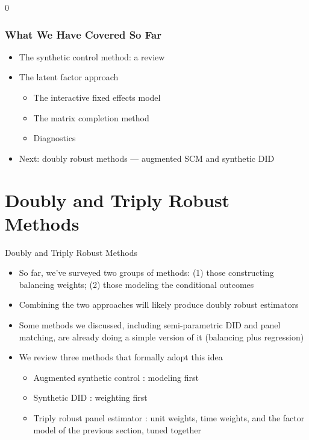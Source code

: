 \documentclass[xcolor=svgnames,9pt,english,t, aspectratio=169]{beamer}
\newcommand{\handout}{0}
\begin{document}



\if\handout0{
\begin{frame}
\frametitle{What We Have Covered So Far}
\addtocounter{framenumber}{-1}
\begin{itemize}\itemsep0.5em
  \item The synthetic control method: a review
  \item The latent factor approach
  \begin{itemize}
    \item The interactive fixed effects model
    \item The matrix completion method
    \item Diagnostics
  \end{itemize}
  \item Next: doubly robust methods --- augmented SCM and synthetic DID
\end{itemize}
\end{frame}
}\fi


\section{Doubly and Triply Robust Methods}

\begin{frame}{Doubly and Triply Robust Methods}
\begin{itemize}\itemsep1em
  \item So far, we've surveyed two groups of methods: (1) those constructing balancing weights; (2) those modeling the conditional outcomes\pause
  \item Combining the two approaches will likely produce doubly robust estimators\pause
  \item Some methods we discussed, including semi-parametric DID and panel matching, are already doing a simple version of it (balancing plus regression)\pause
  \item We review three methods that formally adopt this idea\pause
  \begin{itemize}\itemsep0.5em
    \item Augmented synthetic control {\small{}}: modeling first
    \item Synthetic DID {\small{}}: weighting first
    \item Triply robust panel estimator {\small{}}: unit weights, time weights, and the factor model of the previous section, tuned together
  \end{itemize}
\end{itemize}
\end{frame}
\end{document}
